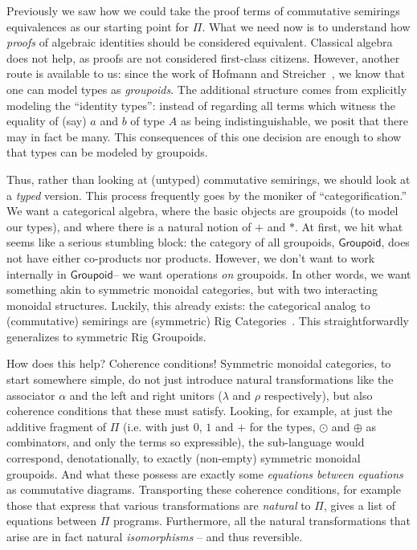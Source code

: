 \documentclass{article}
\newcommand{\Gpd}{\ensuremath{\mathsf{Groupoid}}}
\begin{document}
Previously we saw how we could take the proof terms of commutative semirings
equivalences as our starting point for $\Pi$. What we need
now is to understand how \emph{proofs} of algebraic identities should be
considered equivalent. Classical algebra does not help, as proofs
are not considered first-class citizens. However,
another route is available to us: since the work of
Hofmann and Streicher~\cite{hofmann96thegroupoid}, we know that
one can model types as \emph{groupoids}.  The additional
structure comes from explicitly modeling the ``identity
types'': instead of regarding all terms which witness
the equality of (say) $a$ and $b$ of type $A$ as being
indistinguishable, we posit that there may in fact be many.
This consequences of this one decision are enough to show that
types can be modeled by groupoids.

Thus, rather than looking at (untyped) commutative semirings,
we should look at a \emph{typed} version. This process frequently
goes by the moniker of ``categorification.''  We want a categorical
algebra, where the basic objects are groupoids (to model our types),
and where there is a natural notion of $+$ and $*$.  At first,
we hit what seems like a serious stumbling block: the category of
all groupoids, \Gpd, does not have either co-products
nor products. However, we don't want to work internally in
\Gpd -- we want operations
\emph{on} groupoids. In other words, we want something akin to
symmetric monoidal categories, but with two interacting
monoidal structures.  Luckily, this already exists: the categorical
analog to (commutative) semirings are (symmetric) Rig
Categories~\cite{laplaza72,kelly74}.
This straightforwardly generalizes to symmetric Rig Groupoids.

How does this help? Coherence conditions! Symmetric monoidal categories,
to start somewhere simple, do not just introduce natural transformations
like the associator $\alpha$ and the left and right unitors ($\lambda$
and $\rho$ respectively), but also coherence conditions that these must satisfy.
Looking, for example, at just the additive fragment of $\Pi$ (i.e. with just $0$,
$1$ and $+$ for the types, $\odot$ and $\oplus$ as combinators, and
only the terms so expressible), the sub-language would correspond,
denotationally, to exactly (non-empty) symmetric monoidal groupoids. And what
these possess are exactly some \emph{equations between equations}
as commutative diagrams.  Transporting these coherence conditions, for
example those that express that various transformations are \emph{natural}
to $\Pi$, gives a list of equations between $\Pi$ programs.
Furthermore, all the natural transformations
that arise are in fact natural \emph{isomorphisms} -- and thus
reversible.
\end{document}
